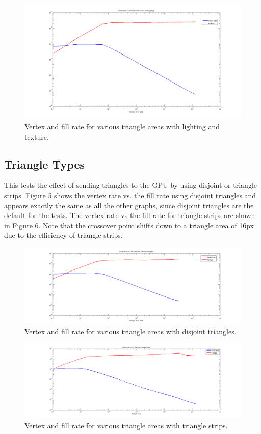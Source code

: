 \documentclass[12pt] {article}
\begin{document}
\begin{figure}[ht!]
	\centering
	\includegraphics[width=5in]{figures/results2-texture-and-light.png}
	\caption{Vertex and fill rate for various triangle areas with lighting and texture.}
\end{figure}
\FloatBarrier


\subsection{Triangle Types}
This tests the effect of sending triangles to the GPU by using disjoint or triangle strips. Figure 5 shows the vertex rate vs. the fill rate using disjoint triangles and appears exactly the same as all the other graphs, since disjoint triangles are the default for the tests. The vertex rate vs the fill rate for triangle strips are shown in Figure 6. Note that the crossover point shifts down to a triangle area of 16px due to the efficiency of triangle strips.
\begin{figure}[ht!]
	\centering
	\includegraphics[width=5in]{figures/results2-disjoint-triangles.png}
	\caption{Vertex and fill rate for various triangle areas with disjoint triangles.}
\end{figure}
\FloatBarrier

\begin{figure}[ht!]
	\centering
	\includegraphics[width=5in]{figures/results2-triangle-strips.png}
	\caption{Vertex and fill rate for various triangle areas with triangle strips.}
\end{figure}
\FloatBarrier
\end{document}
